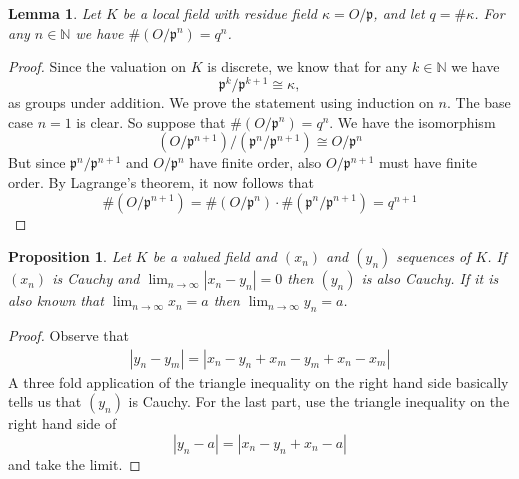 \documentclass{article}
\newtheorem{proposition}{Proposition}[section]
\newtheorem{lemma}{Lemma}[section]
\newcommand{\mfrak}[1]{\mathfrak{#1}}
\newcommand{\mbb}[1]{\mathbb{#1}}
\begin{document}
\begin{lemma}\label{lem: Valuation ring mod power of prime is finite in local field}
    Let $K$ be a local field with residue field $\kappa = O / \mfrak p$, and let $q = \# \kappa$. For any $n \in \mbb N$ we have $\# (O / \mfrak p^n) = q^n$.
\end{lemma}

\begin{proof}
    Since the valuation on $K$ is discrete, we know that for any $k \in \mbb N$ we have $$\mfrak p^k / \mfrak p^{k+1} \cong \kappa,$$
    as groups under addition. We prove the statement using induction on $n$. The base case $n = 1$ is clear. So suppose that $\# (O / \mfrak p^n) = q^n$. We have the isomorphism
    $$(O / \mfrak p^{n+1}) / (\mfrak p^n / \mfrak p^{n+1}) \cong O / \mfrak p^{n}$$
    But since $\mfrak p^n / \mfrak p^{n+1}$ and $O / \mfrak p^{n}$ have finite order, also $O / \mfrak p^{n+1}$ must have finite order. By Lagrange's theorem, it now follows that $$\# (O / \mfrak p^{n+1}) = \# (O / \mfrak p^{n}) \cdot \# (\mfrak p^n / \mfrak p^{n+1}) = q^{n+1}$$
\end{proof}





\begin{proposition}
    Let $K$ be a valued field and $(x_n)$ and $(y_n)$ sequences of $K$. If $(x_n)$ is Cauchy and $\lim_{n \to \infty} |x_n - y_n| = 0$ then $(y_n)$ is also Cauchy. If it is also known that $\lim_{n \to \infty} x_n = a$ then $\lim_{n \to \infty} y_n = a$.
\end{proposition}

\begin{proof}
    Observe that
    \begin{align}
        |y_n - y_m| = |x_n - y_n + x_m - y_m + x_n - x_m|
    \end{align}
    A three fold application of the triangle inequality on the right hand side basically tells us that $(y_n)$ is Cauchy. For the last part, use the triangle inequality on the right hand side of
    $$|y_n - a| = |x_n - y_n + x_n - a|$$ 
    and take the limit.
\end{proof}




\end{document}
